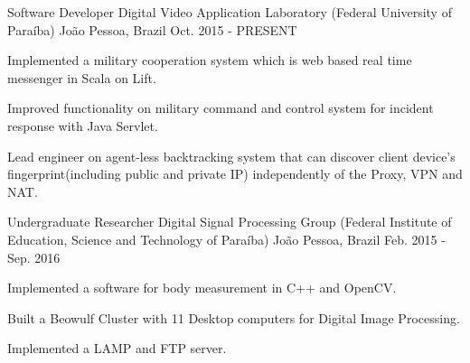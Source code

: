 

\begin{cventries}

  \cventry
    {Software Developer} %
    {Digital Video Application Laboratory (Federal University of Paraíba)} %
    {João Pessoa, Brazil} %
    {Oct. 2015 - PRESENT} %
    {
      \begin{cvitems} %
        \item {Implemented a military cooperation system which is web based real time messenger in Scala on Lift.}
        \item {Improved functionality on military command and control system for incident response with Java Servlet.}
        \item {Lead engineer on agent-less backtracking system that can discover client device's fingerprint(including public and private IP) independently of the Proxy, VPN and NAT.}
      \end{cvitems}
    }
    
  \cventry
    {Undergraduate Researcher} %
    {Digital Signal Processing Group (Federal Institute of Education, Science and Technology of Paraíba)} %
    {João Pessoa, Brazil} %
    {Feb. 2015 - Sep. 2016} %
    {
      \begin{cvitems} %
        \item {Implemented a software for body measurement in C++ and OpenCV.}
        \item {Built a Beowulf Cluster with 11 Desktop computers for Digital Image Processing.}
        \item {Implemented a LAMP and FTP server.}
      \end{cvitems}
    }


\end{cventries}
